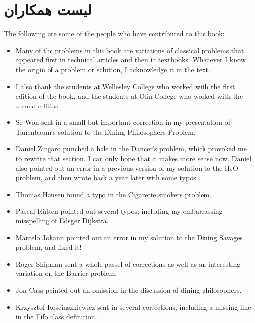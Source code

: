 \documentclass{book}
\begin{document}
\section*{لیست همکاران}

The following are some of the people who have contributed to this
book:

\begin{itemize}

\item Many of the problems in this book are variations of classical
problems that appeared first in technical articles and then in textbooks.
Whenever I know the origin of a problem or solution, I acknowledge it
in the text.

\item I also thank the students at Wellesley College who worked with
the first edition of the book, and the students at Olin College who
worked with the second edition.

\item Se Won sent in a small but important correction in my presentation
of Tanenbaum's solution to the Dining Philosophers Problem.

\item Daniel Zingaro punched a hole in the Dancer's problem, which
provoked me to rewrite that section.  I can only hope that it makes more
sense now.  Daniel also pointed out an error in a previous version of
my solution to the H$_2$O problem, and then wrote back a year later
with some typos.

\item Thomas Hansen found a typo in the Cigarette smokers problem.

\item Pascal R\"{u}tten pointed out several typos, including my embarrassing
misspelling of Edsger Dijkstra.

\item Marcelo Johann pointed out an error in my solution to the
Dining Savages problem, and fixed it!

\item Roger Shipman sent a whole passel of corrections as well as
an interesting variation on the Barrier problem.

\item Jon Cass pointed out an omission in the discussion of dining
philosophers.

\item Krzysztof Ko\'{s}ciuszkiewicz sent in several corrections, including
a missing line in the Fifo class definition.


\end{itemize}
\end{document}

